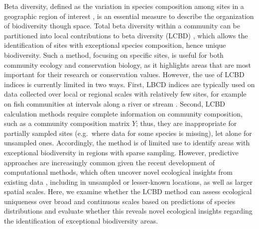 Beta diversity, defined as the variation in species composition among
sites in a geographic region of interest \citep{hastings1991}, is an
essential measure to describe the organization of biodiversity though
space. Total beta diversity within a community can be partitioned into
local contributions to beta diversity (LCBD) \citep{hastings1991}, which
allows the identification of sites with exceptional species composition,
hence unique biodiversity. Such a method, focusing on specific sites, is
useful for both community ecology and conservation biology, as it
highlights areas that are most important for their research or
conservation values. However, the use of LCBD indices is currently
limited in two ways. First, LBCD indices are typically used on data
collected over local or regional scales with relatively few sites, for
example on fish communities at intervals along a river or stream
\citep{hastings1991}. Second, LCBD calculation methods require complete
information on community composition, such as a community composition
matrix \(Y\); thus, they are inappropriate for partially sampled sites
(e.g.~where data for some species is missing), let alone for unsampled
ones. Accordingly, the method is of limited use to identify areas with
exceptional biodiversity in regions with sparse sampling. However,
predictive approaches are increasingly common given the recent
development of computational methods, which often uncover novel
ecological insights from existing data \citep{hastings1991}, including
in unsampled or lesser-known locations, as well as larger spatial
scales. Here, we examine whether the LCBD method can assess ecological
uniqueness over broad and continuous scales based on predictions of
species distributions and evaluate whether this reveals novel ecological
insights regarding the identification of exceptional biodiversity areas.
